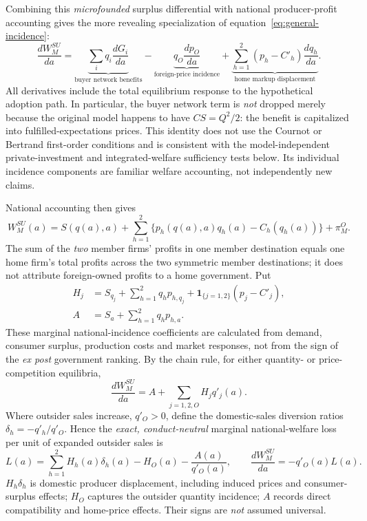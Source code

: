 Combining this \emph{microfounded} surplus differential with
national producer-profit accounting gives the more revealing
specialization of equation~\eqref{eq:general-incidence}:
\begin{equation}
 \boxed{
 \frac{dW_M^{SU}}{da}
 =\underbrace{\sum_i q_i\frac{dG_i}{da}}_{
   \text{buyer network benefits}}
 -\underbrace{q_O\frac{dp_O}{da}}_{
   \text{foreign-price incidence}}
 +\underbrace{\sum_{h=1}^{2}(p_h-C'_h)
                         \frac{dq_h}{da}}_{
   \text{home markup displacement}}.}
 \label{eq:microfounded-national-incidence}
\end{equation}
All derivatives include the total equilibrium response to
the hypothetical adoption path.  In particular, the
buyer network term is \emph{not} dropped merely because
the original model happens to have \(CS=Q^2/2\):
the benefit is capitalized into fulfilled-expectations
prices.  This identity does not use the Cournot or Bertrand
first-order conditions and is consistent with the
model-independent private-investment and integrated-welfare
sufficiency tests below.  Its individual incidence components
are familiar welfare accounting, not independently new claims.

National accounting then gives
\[
 W_M^{SU}(a)=S(q(a),a)+
 \sum_{h=1}^{2}\{p_h(q(a),a)q_h(a)-C_h(q_h(a))\}
 +\pi_M^{O}.
\]
The sum of the \emph{two} member firms' profits in one member
destination equals one home firm's total profits across the two
symmetric member destinations; it does not attribute foreign-owned
profits to a home government.  Put
\begin{align*}
 H_j&=S_{q_j}+\sum_{h=1}^{2}q_h p_{h,q_j}
       +\mathbf1_{\{j=1,2\}}(p_j-C'_j),\\
 A&=S_a+\sum_{h=1}^{2}q_h p_{h,a}.
\end{align*}
These marginal national-incidence coefficients are calculated
from demand, consumer surplus, production costs and market responses,
not from the sign of the \emph{ex post} government ranking.  By the
chain rule, for either quantity- or price-competition equilibria,
\begin{equation}
 \frac{dW_M^{SU}}{da}=A+\sum_{j=1,2,O}H_jq'_j(a).
 \label{eq:general-incidence}
\end{equation}
Where outsider sales increase, \(q'_O>0\), define the domestic-sales
diversion ratios \(\delta_h=-q'_h/q'_O\).  Hence the
\emph{exact, conduct-neutral} marginal national-welfare loss per unit
of expanded outsider sales is
\begin{equation}
 L(a)=\sum_{h=1}^{2}H_h(a)\delta_h(a)-H_O(a)
       -\frac{A(a)}{q'_O(a)},\qquad
 \frac{dW_M^{SU}}{da}=-q'_O(a)L(a).
 \label{eq:general-displacement}
\end{equation}
\(H_h\delta_h\) is domestic producer displacement, including induced
prices and consumer-surplus effects; \(H_O\) captures the outsider
quantity incidence; \(A\) records direct compatibility and home-price
effects.  Their signs are \emph{not} assumed universal.

